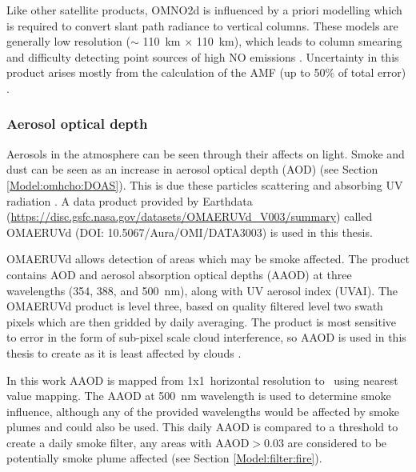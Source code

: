       
      
      
      Like other satellite products, OMNO2d is influenced by a priori modelling which is required to convert slant path radiance to vertical columns.
      These models are generally low resolution ($\sim$ 110~km $\times$ 110~km), which leads to column smearing and difficulty detecting point sources of high NO emissions \parencite{Goldberg2018}.
      Uncertainty in this product arises mostly from the calculation of the AMF (up to 50\% of total error) \parencite{Lorente2017}.
    
    \subsubsection{Aerosol optical depth}
      \label{Model:datasets:OMAERUVd}
      
      Aerosols in the atmosphere can be seen through their affects on light. 
      Smoke and dust can be seen as an increase in aerosol optical depth (AOD) (see Section \ref{Model:omhcho:DOAS}).
      This is due these particles scattering and absorbing UV radiation \parencite{Ahn2008}.
      A data product provided by Earthdata (\url{https://disc.gsfc.nasa.gov/datasets/OMAERUVd_V003/summary}) called OMAERUVd (DOI: 10.5067/Aura/OMI/DATA3003) is used in this thesis. 
      
      
      OMAERUVd allows detection of areas which may be smoke affected.
      The product contains AOD and aerosol absorption optical depths (AAOD) at three wavelengths (354, 388, and 500~nm), along with UV aerosol index (UVAI).
      The OMAERUVd product is level three, based on quality filtered level two swath pixels which are then gridded by daily averaging.
      The product is most sensitive to error in the form of sub-pixel scale cloud interference, so AAOD is used in this thesis to create as it is least affected by clouds \parencite{Ahn2008}.
      
      In this work AAOD is mapped from 1x1\degr ~horizontal resolution to \highhr ~using nearest value mapping.
      The AAOD at 500~nm wavelength is used to determine smoke influence, although any of the provided wavelengths would be affected by smoke plumes and could also be used.
      This daily AAOD is compared to a threshold to create a daily smoke filter, any areas with AAOD$>0.03$ are considered to be potentially smoke plume affected (see Section \ref{Model:filter:fire}).
    
